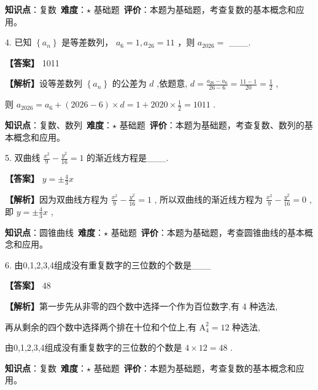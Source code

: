 \documentclass[10pt]{article}
\begin{document}
\begin{analysisbox}[考点分析]
\textbf{知识点}：复数\
\textbf{难度}：$\star$ 基础题\
\textbf{评价}：本题为基础题，考查复数的基本概念和应用。
\end{analysisbox}

4. 已知 \(\left\{  {a}_{n}\right\}\) 是等差数列， \({a}_{6} = 1,{a}_{26} = {11}\) ，则 \({a}_{2026} =\) ___.

\textbf{【答案】} 1011

\textbf{【解析】}设等差数列 \(\left\{  {a}_{n}\right\}\) 的公差为 \(d\) ,依题意, \(d = \frac{{a}_{26} - {a}_{6}}{{26} - 6} = \frac{{11} - 1}{20} = \frac{1}{2}\) ,

则 \({a}_{2026} = {a}_{6} + \left( {{2026} - 6}\right)  \times  d = 1 + {2020} \times  \frac{1}{2} = {1011}\) .

\begin{analysisbox}[考点分析]
\textbf{知识点}：复数、数列\
\textbf{难度}：$\star$ 基础题\
\textbf{评价}：本题为基础题，考查复数、数列的基本概念和应用。
\end{analysisbox}

5. 双曲线 \(\frac{{x}^{2}}{9} - \frac{{y}^{2}}{16} = 1\) 的渐近线方程是___.

\textbf{【答案】} \(y =  \pm  \frac{4}{3}x\)

\textbf{【解析】}因为双曲线方程为 \(\frac{{x}^{2}}{9} - \frac{{y}^{2}}{16} = 1\) , 所以双曲线的渐近线方程为 \(\frac{{x}^{2}}{9} - \frac{{y}^{2}}{16} = 0\) ,即 \(y =  \pm  \frac{4}{3}x\) ,

\begin{analysisbox}[考点分析]
\textbf{知识点}：圆锥曲线\
\textbf{难度}：$\star$ 基础题\
\textbf{评价}：本题为基础题，考查圆锥曲线的基本概念和应用。
\end{analysisbox}

6. 由0,1,2,3,4组成没有重复数字的三位数的个数是___

\textbf{【答案】} 48

\textbf{【解析】}第一步先从非零的四个数中选择一个作为百位数字,有 4 种选法,

再从剩余的四个数中选择两个排在十位和个位上,有 \({\mathrm{A}}_{4}^{2} = {12}\) 种选法,

由0,1,2,3,4组成没有重复数字的三位数的个数是 \(4 \times  {12} = {48}\) .

\begin{analysisbox}[考点分析]
\textbf{知识点}：复数\
\textbf{难度}：$\star$ 基础题\
\textbf{评价}：本题为基础题，考查复数的基本概念和应用。
\end{analysisbox}
\end{document}
